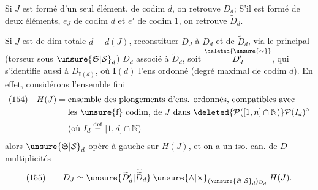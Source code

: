 Si $J$ est formé d'un seul élément, de codim $d$, on retrouve $D_d$; S'il est formé de deux éléments,  $e_J$ de codim $d$ et $e'$ de codim $1$, on retrouve $\widetilde D_d$.

Si $J$ est de dim totale $d=d(J)$,   reconstituer $D_J$ à  $D_d$ et de $\widetilde D_d$, via le  principal (torseur sous $\unsure{\mathfrak S|\mathcal S}_d$)  $D_d$ associé à $\widetilde D_d$, soit $\overset{\deleted{\unsure{\sim}}}{D'_d}$, qui s'identifie aussi à $D_{\mathbf I(d)}$, où $\mathbf I(d)$ l'ens ordonné
(degré maximal de codim $d$). En effet, considérons
l'ensemble fini
\[
\begin{aligned}
(154)\quad H(J)={}&\text{ensemble des plongements d'ens. ordonnés, compatibles avec}\\
&\text{les \unsure{f} codim, de }J\text{ dans }\deleted{\mathcal P([1,n]\cap\mathbb N)}\mathcal P(I_d)^\circ\\
&\text{(où }I_d\overset{\mathrm{def}}=[1,d]\cap\mathbb N\text{)}
\end{aligned}
\]
alors $\unsure{\mathfrak S|\mathcal S}_d$ opère à gauche sur $H(J)$, et on a un iso. can. de $D$-multiplicités
\[
(155)\qquad D_J\simeq\unsure{\widetilde D'_d|\widetilde{\widetilde D}_d}\mathbin{\unsure{\wedge|\times}}_{(\unsure{\mathfrak S|\mathcal S}_d)_{D_d}}H(J).
\]


